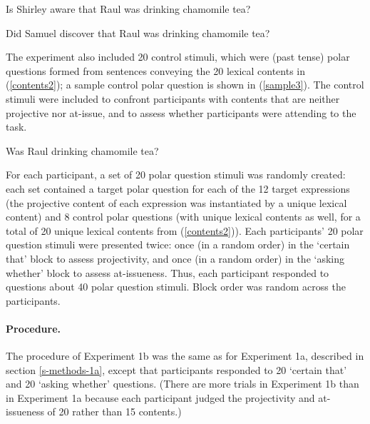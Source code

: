 \documentclass[11pt,fleqn]{article}
\newcommand{\6}{\mbox{$[\hspace*{-.6mm}[$}}
\newcommand{\9}{\mbox{$]\hspace*{-.6mm}]$}}
\begin{document}
\begin{exe}
\ex\label{sample2}
\begin{xlist}
\ex Is Shirley aware that Raul was drinking chamomile tea?

\ex Did Samuel discover that Raul was drinking chamomile tea?
\end{xlist}
\end{exe}

The experiment also included 20 control stimuli, which were (past tense) polar questions formed from sentences conveying the 20 lexical contents in (\ref{contents2}); a sample control polar question is shown in (\ref{sample3}). The control stimuli were included to confront participants with contents that are neither projective nor at-issue, and to assess whether participants were attending to the task.

\begin{exe}
\ex\label{sample3} Was Raul drinking chamomile tea?
\end{exe}

For each participant, a set of 20 polar question stimuli was randomly created: each set contained a target polar question for each of the 12 target expressions (the projective content of each expression was instantiated by a unique lexical content) and 8 control polar questions (with unique lexical contents as well, for a total of 20 unique lexical contents from (\ref{contents2})). Each participants' 20 polar question stimuli were presented twice: once (in a random order) in the `certain that' block to assess projectivity, and once (in a random order) in the `asking whether' block to assess at-issueness. Thus, each participant responded to questions about 40 polar question stimuli. Block order was random across the participants.

\paragraph{Procedure.} The procedure of Experiment 1b was the same as for Experiment 1a, described in section \ref{s-methods-1a}, except that participants responded to 20 `certain that' and 20 `asking whether' questions. (There are more trials in Experiment 1b than in Experiment 1a because each participant judged the projectivity and at-issueness of 20  rather than 15 contents.)
\end{document}

